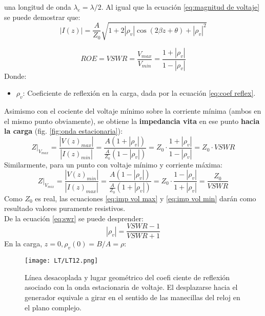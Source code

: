 \documentclass[
	12pt, %
	fleqn, %
	a4paper, %
	oneside, %
]{LegrandOrangeBook}
\begin{document}
una longitud de onda $\lambda_e=\lambda/2$.
Al igual que la ecuación \ref{eq:magnitud de voltaje} se puede demostrar que:
\begin{equation}
|I(z)|=\frac{A}{Z_0}\sqrt{1+2|\rho_v|\cos(2\beta z+\theta)+|\rho_v|^2}
\label{eq:magnitud de corriente}
\end{equation}
\begin{definition}
\begin{equation}
ROE=VSWR=\frac{V_{max}}{V_{min}}=\frac{1+|\rho_v|}{1-|\rho_v|}
\label{eq:swr}
\end{equation}
Donde:
\begin{itemize}
\item $\rho_v$: Coeficiente de reflexión en la carga, dada por la ecuación \ref{eq:coef reflex}.
\end{itemize}
\end{definition}
Asimismo con el cociente del voltaje mínimo sobre la corriente mínima (ambos en el mismo punto obviamente), se obtiene la \textbf{impedancia vita} en ese punto \textbf{hacia la carga} (fig. \ref{fig:onda estacionaria}):
\begin{equation}
Z|_{V_{max}}=\frac{|V(z)_{max}|}{|I(z)_{min}|}=\frac{A(1+|\rho_v|)}{\frac{A}{Z_0}(1-|\rho_v|)}=Z_0\cdot\frac{1+|\rho_v|}{1-|\rho_v|}=Z_0\cdot VSWR
\label{eq:imp vol max}
\end{equation}
Similarmente, para un punto con voltaje mínimo y corriente máxima:
\begin{equation}
Z|_{V_{mix}}=\frac{|V(z)_{min}|}{|I(z)_{max}|}=\frac{A(1-|\rho_v|)}{\frac{A}{Z_0}(1+|\rho_v|)}=Z_0\cdot\frac{1-|\rho_v|}{1+|\rho_v|}=\frac{Z_0}{VSWR}
\label{eq:imp vol min}
\end{equation}
Como $Z_0$ es real, las ecuaciones \ref{eq:imp vol max} y \ref{eq:imp vol min} darán como resultado valores puramente resistivos.\\
De la ecuación \ref{eq:swr} se puede desprender:
\begin{equation}
|\rho_v|=\frac{VSWR-1}{VSWR+1}
\label{eq:coef reflex func vswr}
\end{equation}
En la carga, $z=0, \rho_v(0)=B/A=\rho$:
\begin{figure}[H]
\centering
\texttt{[image: LT/LT12.png]}
\caption{Línea desacoplada y lugar geométrico del coefi ciente de reflexión asociado con la onda estacionaria de voltaje. El desplazarse hacia el generador equivale a girar en el sentido de las manecillas del reloj en el plano complejo.}
\label{fig:plano complejo reflex}
\end{figure}
\end{document}
